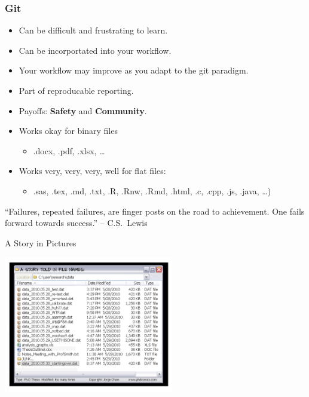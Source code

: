   \begin{frame}[t]
    \frametitle{Git}
    \begin{itemize}
      \item Can be difficult and frustrating to learn.
      \item Can be incorportated into your workflow.
      \item Your workflow may improve as you adapt to the git paradigm.
      \item Part of reproducable reporting.
      \item Payoffs: {\bf Safety} and {\bf Community}.
      \item Works okay for binary files 
        \begin{itemize} \item .docx, .pdf, .xlsx, \ldots \end{itemize}
      \item Works very, very, very, well for flat files: 
        \begin{itemize} \item .sas, .tex, .md, .txt, .R, .Rnw, .Rmd, .html, .c,
          .cpp, .js, .java, \ldots) \end{itemize}
        
    \end{itemize}
    ``Failures, repeated failures, are finger posts on the road to achievement.
    One fails forward towards success.'' -- C.S.\ Lewis
  \end{frame}

  \begin{frame}[t]{A Story in Pictures} 
    \begin{center}
      \includegraphics[height=2.350in]{../images/phd052810s.png} 
    \end{center} 
  \end{frame}
    


